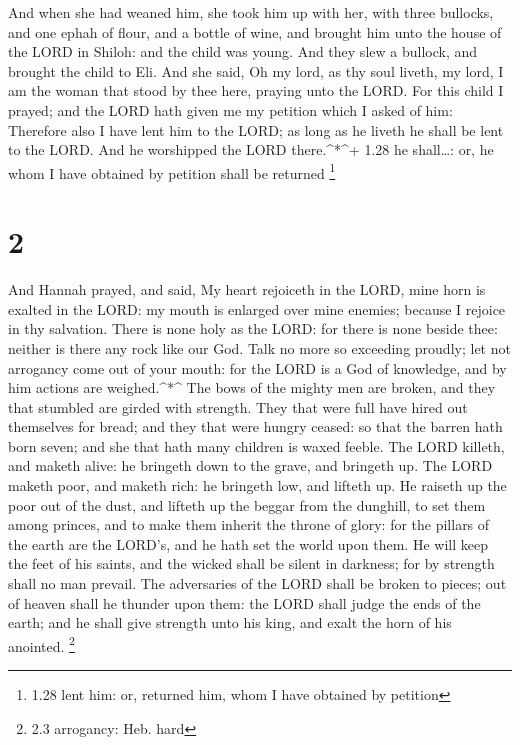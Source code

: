 And when she had weaned him, she took him up with her,
with three bullocks, and one ephah of flour, and a bottle of wine, and
brought him unto the house of the LORD in Shiloh: and the child was
young.  And they slew a bullock, and brought the child to
Eli.  And she said, Oh my lord, as thy soul liveth, my
lord, I am the woman that stood by thee here, praying unto the LORD.
 For this child I prayed; and the LORD hath given me my
petition which I asked of him:  Therefore also I have lent
him to the LORD; as long as he liveth he shall be lent to the LORD. And
he worshipped the LORD there.\^{}*\^{}+ 1.28 he shall\ldots: or, he whom
I have obtained by petition shall be returned \footnote{1.28 lent him:
  or, returned him, whom I have obtained by petition}

\hypertarget{section-1}{%
\section{2}\label{section-1}}

 And Hannah prayed, and said, My heart rejoiceth in the
LORD, mine horn is exalted in the LORD: my mouth is enlarged over mine
enemies; because I rejoice in thy salvation.  There is none
holy as the LORD: for there is none beside thee: neither is there any
rock like our God.  Talk no more so exceeding proudly; let
not arrogancy come out of your mouth: for the LORD is a God of
knowledge, and by him actions are weighed.\^{}*\^{}  The
bows of the mighty men are broken, and they that stumbled are girded
with strength.  They that were full have hired out
themselves for bread; and they that were hungry ceased: so that the
barren hath born seven; and she that hath many children is waxed feeble.
 The LORD killeth, and maketh alive: he bringeth down to the
grave, and bringeth up.  The LORD maketh poor, and maketh
rich: he bringeth low, and lifteth up.  He raiseth up the
poor out of the dust, and lifteth up the beggar from the dunghill, to
set them among princes, and to make them inherit the throne of glory:
for the pillars of the earth are the LORD's, and he hath set the world
upon them.  He will keep the feet of his saints, and the
wicked shall be silent in darkness; for by strength shall no man
prevail.  The adversaries of the LORD shall be broken to
pieces; out of heaven shall he thunder upon them: the LORD shall judge
the ends of the earth; and he shall give strength unto his king, and
exalt the horn of his anointed. \footnote{2.3 arrogancy: Heb. hard}

